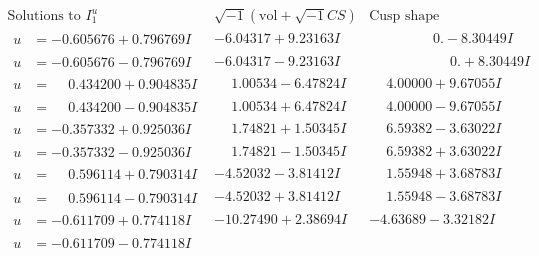 \documentclass[1p]{elsarticle_modified}
\theoremstyle{definition}
\newcommand{\I}{\sqrt{-1}}
\begin{document}
$$\begin{array}{c|c|c}  
\text{Solutions to }I^u_{1}& \I (\text{vol} + \sqrt{-1}CS) & \text{Cusp shape}\\
 \hline 
\begin{aligned}
u &= -0.605676 + 0.796769 I\end{aligned}
 & -6.04317 + 9.23163 I & \phantom{-0.000000 } 0. - 8.30449 I \\ \hline\begin{aligned}
u &= -0.605676 - 0.796769 I\end{aligned}
 & -6.04317 - 9.23163 I & \phantom{-0.000000 -}0. + 8.30449 I \\ \hline\begin{aligned}
u &= \phantom{-}0.434200 + 0.904835 I\end{aligned}
 & \phantom{-}1.00534 - 6.47824 I & \phantom{-}4.00000 + 9.67055 I \\ \hline\begin{aligned}
u &= \phantom{-}0.434200 - 0.904835 I\end{aligned}
 & \phantom{-}1.00534 + 6.47824 I & \phantom{-}4.00000 - 9.67055 I \\ \hline\begin{aligned}
u &= -0.357332 + 0.925036 I\end{aligned}
 & \phantom{-}1.74821 + 1.50345 I & \phantom{-}6.59382 - 3.63022 I \\ \hline\begin{aligned}
u &= -0.357332 - 0.925036 I\end{aligned}
 & \phantom{-}1.74821 - 1.50345 I & \phantom{-}6.59382 + 3.63022 I \\ \hline\begin{aligned}
u &= \phantom{-}0.596114 + 0.790314 I\end{aligned}
 & -4.52032 - 3.81412 I & \phantom{-}1.55948 + 3.68783 I \\ \hline\begin{aligned}
u &= \phantom{-}0.596114 - 0.790314 I\end{aligned}
 & -4.52032 + 3.81412 I & \phantom{-}1.55948 - 3.68783 I \\ \hline\begin{aligned}
u &= -0.611709 + 0.774118 I\end{aligned}
 & -10.27490 + 2.38694 I & -4.63689 - 3.32182 I \\ \hline\begin{aligned}
u &= -0.611709 - 0.774118 I\end{aligned}

\end{array}$$
\end{document}
